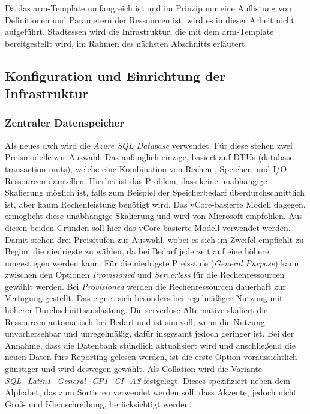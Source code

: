 Da das \ac{arm}-Template umfangreich ist und im Prinzip nur eine Auflistung von Definitionen und Parametern der Ressourcen ist, wird es in dieser Arbeit nicht aufgeführt. Stadtessen wird die Infrastruktur, die mit dem \ac{arm}-Template bereitgestellt wird, im Rahmen des nächsten Abschnitts erläutert.

\subsection{Konfiguration und Einrichtung der Infrastruktur} \label{subsec:infra:konfig}

\subsubsection{Zentraler Datenspeicher} \label{subsec:infra:konfig:datenspeicher}
Als neues \ac{dwh} wird die \textit{Azure SQL Database} verwendet. Für diese stehen zwei Preismodelle zur Auswahl. Das anfänglich einzige, basiert auf DTUs (database transaction units), welche eine Kombination von Rechen-, Speicher- und I/O Ressourcen darstellen. Hierbei ist das Problem, dass keine unabhängige Skalierung möglich ist, falls zum Beispiel der Speicherbedarf überdurchschnittlich ist, aber kaum Rechenleistung benötigt wird. Das vCore-basierte Modell dagegen, ermöglicht diese unabhängige Skalierung und wird von Microsoft empfohlen. Aus diesen beiden Gründen soll hier das vCore-basierte Modell verwendet werden. Damit stehen drei Preisstufen zur Auswahl, wobei es sich im Zweifel empfiehlt zu Beginn die niedrigste zu wählen, da bei Bedarf jederzeit auf eine höhere umgestiegen werden kann. Für die niedrigste Preisstufe (\textit{General Purpose}) kann zwischen den Optionen \textit{Provisioned} und \textit{Serverless} für die Rechenressourcen gewählt werden. Bei \textit{Provisioned} werden die Rechenressourcen dauerhaft zur Verfügung gestellt. Das eignet sich besonders bei regelmäßiger Nutzung mit höherer Durchschnittsauslastung. Die serverlose Alternative skaliert die Ressourcen automatisch bei Bedarf und ist sinnvoll, wenn die Nutzung unvorhersehbar und unregelmäßig, dafür insgesamt jedoch geringer ist. Bei der Annahme, dass die Datenbank stündlich aktualisiert wird und anschließend die neuen Daten fürs Reporting gelesen werden, ist die erste Option voraussichtlich günstiger und wird deswegen gewählt. Als Collation wird die Variante \textit{SQL{\_}Latin1{\_}General{\_}CP1{\_}CI{\_}AS} festgelegt. Dieses spezifiziert neben dem Alphabet, das zum Sortieren verwendet werden soll, dass Akzente, jedoch nicht Groß- und Kleinschreibung, berücksichtigt werden. \cite[vgl.][]{mauri_azure_2021}

